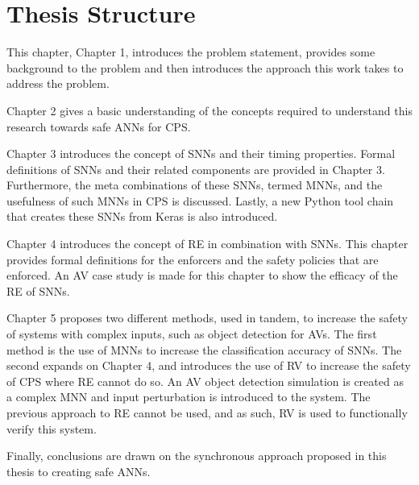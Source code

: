 \section{Thesis Structure}
This chapter, Chapter 1, introduces the problem statement, provides some background to the problem and then introduces the approach this work takes to address the problem.

Chapter 2 gives a basic understanding of the concepts required to understand this research towards safe \acp{ANN} for \ac{CPS}.

Chapter 3 introduces the concept of \acfp{SNN} and their timing properties.
Formal definitions of \acp{SNN} and their related components are provided in Chapter 3.
Furthermore, the meta combinations of these \acp{SNN}, termed \acp{MNN}, and the usefulness of such \acp{MNN} in \ac{CPS} is discussed.
Lastly, a new Python tool chain that creates these \acp{SNN} from Keras is also introduced.

Chapter 4 introduces the concept of \acf{RE} in combination with \acp{SNN}. 
This chapter provides formal definitions for the enforcers and the safety policies that are enforced.
An \acf{AV} case study is made for this chapter to show the efficacy of the \ac{RE} of \acp{SNN}.

Chapter 5 proposes two different methods, used in tandem, to increase the safety of systems with complex inputs, such as object detection for \acp{AV}.
The first method is the use of \acp{MNN} to increase the classification accuracy of \acp{SNN}.
The second expands on Chapter 4, and introduces the use of \ac{RV} to increase the safety of \ac{CPS} where \ac{RE} cannot do so.
An \ac{AV} object detection simulation is created as a complex \ac{MNN} and input perturbation is introduced to the system.
The previous approach to \ac{RE} cannot be used, and as such, \ac{RV} is used to functionally verify this system.

Finally, conclusions are drawn on the synchronous approach proposed in this thesis to creating safe \acp{ANN}.

